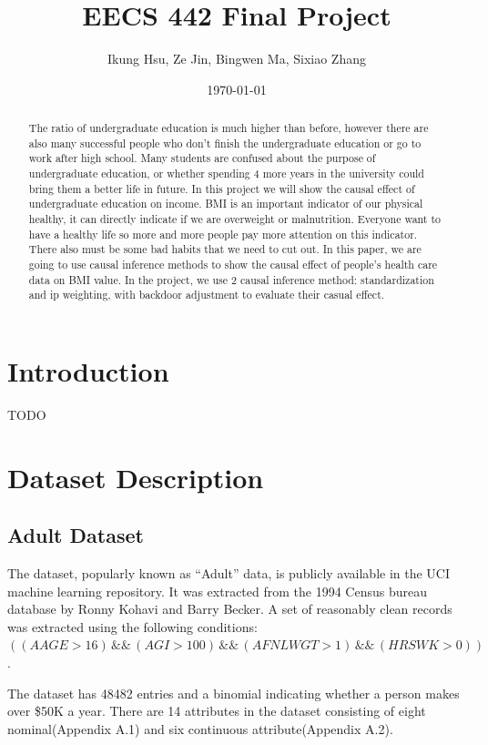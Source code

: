 \documentclass[letterpaper,12pt]{article}
\begin{document}
\title{EECS 442 Final Project}
\author{Ikung Hsu, Ze Jin, Bingwen Ma, Sixiao Zhang}
\date{\today}
\maketitle

\begin{abstract}
\noindent The ratio of undergraduate education is much higher than before, however there are also many successful people who don’t finish the undergraduate education or go to work after high school. Many students are confused about the purpose of undergraduate education, or whether spending 4 more years in the university could bring them a better life in future. In this project we will show the causal effect of undergraduate education on income. BMI is an important indicator of our physical healthy, it can directly indicate if we are overweight or malnutrition. Everyone want to have a healthy life so more and more people pay more attention on this indicator. There also must be some bad habits that we need to cut out. In this paper, we are going to use causal inference methods to show the causal effect of people's health care data on BMI value. In the project, we use 2 causal inference method: standardization and ip weighting, with backdoor adjustment to evaluate their casual effect.
\end{abstract}


\section{Introduction}
TODO

\section{Dataset Description}
\subsection{Adult Dataset}

The dataset, popularly known as “Adult” data, is publicly available in the UCI machine learning repository. It was extracted from the 1994  Census bureau database by Ronny Kohavi and Barry Becker.  A set of reasonably clean records was extracted using the following conditions: $((AAGE>16) \,\&\&\,  (AGI>100) \,\&\&\,  (AFNLWGT>1)\,\&\&\, (HRSWK>0))$. \par
\noindent The dataset has 48482 entries and a binomial indicating whether a person makes over \$50K a year. There are  14 attributes in the dataset consisting of eight nominal(Appendix A.1) and six continuous attribute(Appendix A.2).\par
\end{document}
